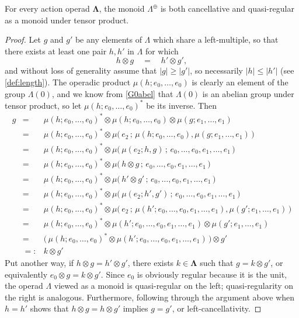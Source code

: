 \documentclass{amsbook} %
\newcommand{\ML}{\mathbf{\Lambda}}
\newcommand{\LL}{\Lambda}
\numberwithin{section}{chapter}
\begin{document}

\begin{prop} \label{cqr} For every action operad $\ML$, the monoid $\Lambda^{\oplus}$ is both cancellative and quasi-regular as a monoid under tensor product.
\end{prop}
\begin{proof}
Let $g$ and $g'$ be any elements of $\Lambda$ which share a left-multiple, so that there exists at least one pair $h, h'$ in $\Lambda$ for which
\[ h \otimes g \quad = \quad h' \otimes g', \]
and without loss of generality assume that $|g| \ge |g'|$, so necessarily $|h| \le |h'|$ (see \cref{def:length}). The operadic product $\mu(h; e_0, \ldots, e_0)$ is clearly an element of the group $\LL(0)$, and we know from \cref{G0abel} that $\LL(0)$ is an abelian group under tensor product, so let $\mu(h; e_0, \ldots, e_0)^*$ be its inverse. Then
\[ \begin{array}{rll}
			g & = & \mu(h; e_0, \ldots, e_0)^* \otimes \mu(h; e_0, \ldots, e_0) \otimes \mu(g; e_1, \ldots, e_1) \\
			& = & \mu(h; e_0, \ldots, e_0)^* \otimes \mu\big( \, e_2 \, ; \, \mu(h; e_0, \ldots, e_0), \mu(g; e_1, \ldots, e_1) \, \big) \\
			& = & \mu(h; e_0, \ldots, e_0)^* \otimes \mu\big( \, \mu(e_2; h, g) \, ; \, e_0, \ldots, e_0, e_1, \ldots, e_1 \, \big) \\
			& = & \mu(h; e_0, \ldots, e_0)^* \otimes \mu\big( \, h \otimes g \, ; \, e_0, \ldots, e_0, e_1, \ldots, e_1 \, \big) \\
			& = & \mu(h; e_0, \ldots, e_0)^* \otimes \mu\big( \, h' \otimes g' \, ; \, e_0, \ldots, e_0, e_1, \ldots, e_1 \, \big) \\
			& = & \mu(h; e_0, \ldots, e_0)^* \otimes \mu\big( \, \mu(e_2; h', g') \, ; \, e_0, \ldots, e_0, e_1, \ldots, e_1 \, \big) \\
			& = & \mu(h; e_0, \ldots, e_0)^* \otimes \mu\big( \, e_2 \, ; \, \mu(h'; e_0, \ldots, e_0, e_1, \ldots, e_1), \mu(g'; e_1, \ldots, e_1) \, \big) \\
			& = & \mu(h; e_0, \ldots, e_0)^* \otimes \mu(h'; e_0, \ldots, e_0, e_1, \ldots, e_1) \otimes \mu(g'; e_1, \ldots, e_1) \\
			& = & \big( \, \mu(h; e_0, \ldots, e_0)^* \otimes \mu(h'; e_0, \ldots, e_0, e_1, \ldots, e_1) \, \big) \otimes g' \\
			& =: & k \otimes g'
		\end{array}
\]
Put another way, if $h \otimes g = h' \otimes g'$, there exists $k \in \ML$ such that $g = k \otimes g'$, or equivalently $e_0 \otimes g = k \otimes g'$. Since
 $e_0$ is obviously regular because it is the unit, the operad $\LL$ viewed as a monoid is quasi-regular on the left; quasi-regularity on the right is analogous. Furthermore, following through the argument above when $h = h'$ shows that $h \otimes g = h \otimes g'$ implies $g = g'$, or left-cancellativity.
\end{proof}
\end{document}
